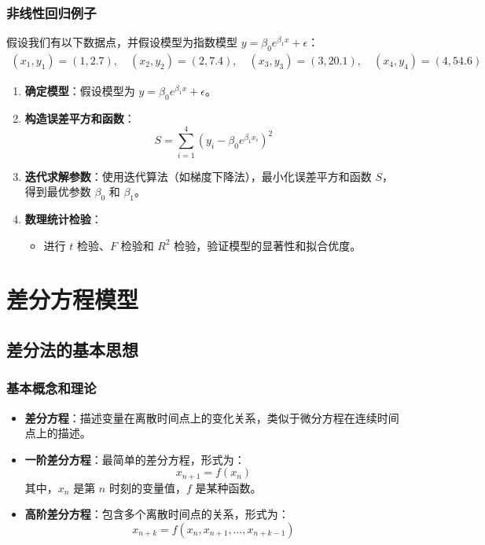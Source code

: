 \documentclass[UTF8]{ctexart}
\begin{document}
\subsubsection {非线性回归例子}
假设我们有以下数据点，并假设模型为指数模型 \( y = \beta_0 e^{\beta_1 x} + \epsilon \)：
\[
\begin{aligned}
(x_1, y_1) = (1, 2.7), \quad (x_2, y_2) = (2, 7.4), \quad (x_3, y_3) = (3, 20.1), \quad (x_4, y_4) = (4, 54.6)
\end{aligned}
\]
\begin{enumerate}
    \item \textbf{确定模型}：假设模型为 \( y = \beta_0 e^{\beta_1 x} + \epsilon \)。
    \item \textbf{构造误差平方和函数}：
    \[
    S = \sum_{i=1}^{4} (y_i - \beta_0 e^{\beta_1 x_i})^2
    \]
    \item \textbf{迭代求解参数}：使用迭代算法（如梯度下降法），最小化误差平方和函数 \( S \)，得到最优参数 \(\beta_0\) 和 \(\beta_1\)。
    \item \textbf{数理统计检验}：
        \begin{itemize}
            \item 进行 \(t\) 检验、\(F\) 检验和 \(R^2\) 检验，验证模型的显著性和拟合优度。
        \end{itemize}
\end{enumerate}

\newpage

\section {差分方程模型}
\subsection {差分法的基本思想}
\subsubsection {基本概念和理论}
\begin{itemize}
    \item \textbf{差分方程}：描述变量在离散时间点上的变化关系，类似于微分方程在连续时间点上的描述。
    \item \textbf{一阶差分方程}：最简单的差分方程，形式为：
    \[
    x_{n+1} = f(x_n)
    \]
    其中，\( x_n \) 是第 \( n \) 时刻的变量值，\( f \) 是某种函数。
    \item \textbf{高阶差分方程}：包含多个离散时间点的关系，形式为：
    \[
    x_{n+k} = f(x_n, x_{n+1}, \ldots, x_{n+k-1})
    \]
\end{itemize}
\end{document}
